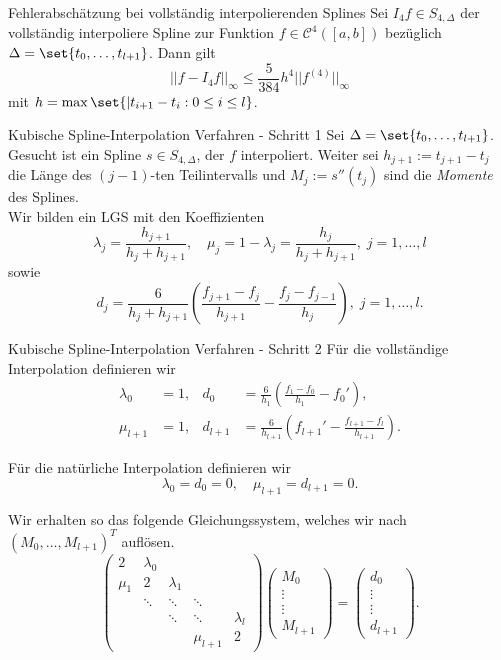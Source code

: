 \begin{karte}{Fehlerabschätzung bei vollständig interpolierenden Splines}
	Sei \( I_4f \in S_{4,\Delta} \) der vollständig interpoliere Spline 
	zur Funktion \( f \in \mathcal{C}^4([a,b]) \) bezüglich 
	\( \Delta = \set{t_0, \ldots, t_{l+1}} \). Dann gilt 
	\[ || f - I_4f ||_\infty \leq \frac{5}{384}h^4 || f^{(4)}||_\infty \]
	mit \( h = \max\set{|t_{i+1} - t_i : 0 \leq i \leq l} \).
\end{karte}

\begin{karte}{Kubische Spline-Interpolation Verfahren - Schritt 1}
	Sei \( \Delta = \set{t_0,\ldots, t_{l+1}} \). Gesucht ist ein Spline \( s\in S_{4,\Delta} \), 
	der \(f\) interpoliert.
	Weiter sei \( h_{j+1} := t_{j+1} - t_j \) die Länge des \( (j-1) \)-ten Teilintervalls 
	und \( M_j := s''(t_j) \) sind die \textit{Momente} des Splines.\\
	Wir bilden ein LGS mit den Koeffizienten 
	\[ \lambda_j = \frac{h_{j+1}}{h_j + h_{j+1}}, \quad \mu_j = 1 - \lambda_j = \frac{h_j}{h_j + h_{j+1}}, \;j = 1,\ldots, l \]
	sowie 
	\[ d_j = \frac{6}{h_j + h_{j+1}} \left( \frac{f_{j+1} - f_j}{h_{j+1}} - \frac{f_j - f_{j-1}}{h_j} \right), \;j = 1,\ldots, l. \]
\end{karte}

\begin{karte}{Kubische Spline-Interpolation Verfahren - Schritt 2}
	Für die vollständige Interpolation definieren wir 
	\begin{align*}
		\lambda_0 &= 1, &d_0 &= \frac{6}{h_1}\left( \frac{f_1 - f_0}{h_1} - f_0' \right), \\
		\mu_{l+1} &= 1, &d_{l+1} &= \frac{6}{h_{l+1}} \left( f_{l+1}' - \frac{f_{l+1} - f_l}{h_{l+1}} \right).
	\end{align*}

	Für die natürliche Interpolation definieren wir 
	\[ \lambda_0 = d_0 = 0, \quad \mu_{l+1} = d_{l+1} = 0. \]

	Wir erhalten so das folgende Gleichungssystem, welches wir nach 
	\( (M_0,\ldots, M_{l+1})^T \) auflösen.
	\[ \begin{pmatrix}
		2 & \lambda_0 & \\
		\mu_1 & 2 & \lambda_1 \\
		& \ddots & \ddots & \ddots \\
		& & \ddots & \ddots & \lambda_l \\
		& & & \mu_{l+1} & 2
	\end{pmatrix} \begin{pmatrix}
		M_0 \\ \vdots \\ \vdots \\ M_{l+1}
	\end{pmatrix} = \begin{pmatrix}
		d_0 \\ \vdots \\ \vdots \\ d_{l+1}
	\end{pmatrix}. \]
\end{karte}

